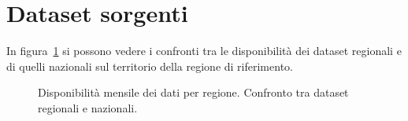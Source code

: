 \section{Dataset sorgenti}\label{sec:datasets}
In figura~\ref{fig:regional-monthly} si possono vedere i confronti tra le disponibilità dei dataset regionali e di quelli nazionali sul territorio della regione di riferimento.
\begin{figure}
  \centering
  
  \caption{Disponibilità mensile dei dati per regione. Confronto tra dataset regionali e nazionali.}\label{fig:regional-monthly}
\end{figure}

\begin{table}
  
\end{table}